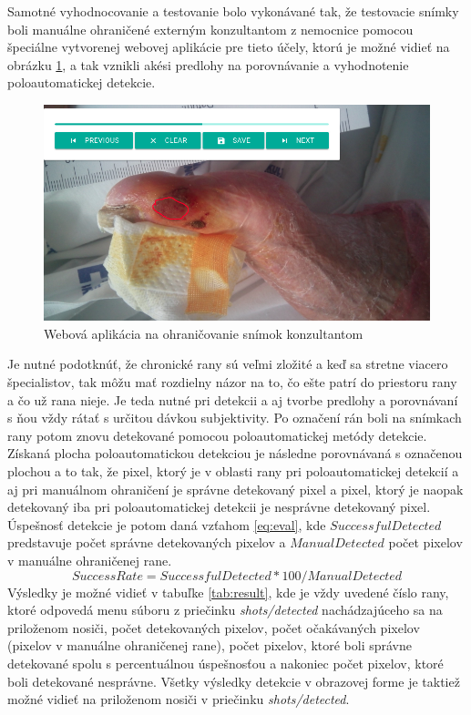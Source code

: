 Samotné vyhodnocovanie a testovanie bolo vykonávané tak, že testovacie snímky boli manuálne ohraničené externým konzultantom z nemocnice pomocou špeciálne vytvorenej webovej aplikácie pre tieto účely, ktorú je možné vidieť na obrázku \ref{fig:anotator}, a tak vznikli akési predlohy na porovnávanie a vyhodnotenie poloautomatickej detekcie. 
\begin{figure}[h]
  \centering
  \includegraphics[scale=0.5]{fig/anotator.png}
  \caption{Webová aplikácia na ohraničovanie snímok konzultantom}
  \label{fig:anotator}
\end{figure}
Je nutné podotknúť, že chronické rany sú veľmi zložité a keď sa stretne viacero špecialistov, tak môžu mať rozdielny názor na to, čo ešte patrí do priestoru rany a čo už rana nieje. Je teda nutné pri detekcii a aj tvorbe predlohy a porovnávaní s ňou vždy rátať s určitou dávkou subjektivity. Po označení rán boli na snímkach rany potom znovu detekované pomocou poloautomatickej metódy detekcie. Získaná plocha poloautomatickou detekciou je následne porovnávaná s označenou plochou a to tak, že pixel, ktorý je v oblasti rany pri poloautomatickej detekcií a aj pri manuálnom ohraničení je správne detekovaný pixel a pixel, ktorý je naopak detekovaný iba pri poloautomatickej detekcii je nesprávne detekovaný pixel. Úspešnosť detekcie je potom daná vzťahom \ref{eq:eval}, kde $SuccessfulDetected$ predstavuje počet správne detekovaných pixelov a $ManualDetected$ počet pixelov v manuálne ohraničenej rane.
\begin{equation}
    \label{eq:eval}
    SuccessRate = SuccessfulDetected * 100 / ManualDetected
\end{equation}
Výsledky je možné vidieť v tabuľke \ref{tab:result}, kde je vždy uvedené číslo rany, ktoré odpovedá menu súboru z priečinku \textit{shots/detected} nachádzajúceho sa na priloženom nosiči, počet detekovaných pixelov, počet očakávaných pixelov (pixelov v manuálne ohraničenej rane), počet pixelov, ktoré boli správne detekované spolu s percentuálnou úspešnosťou a nakoniec počet pixelov, ktoré boli detekované nesprávne. Všetky výsledky detekcie v obrazovej forme je taktiež možné vidieť na priloženom nosiči v priečinku \textit{shots/detected}.
